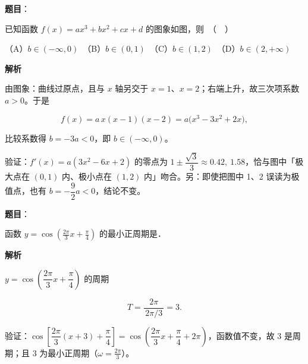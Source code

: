 \begin{answer}

\textbf{题目}：

已知函数 $f(x) = ax^3 + bx^2 + cx + d$ 的图象如图，则　（　）
\nopagebreak[4]
\begin{center}\end{center}
\nopagebreak[4]
（A）$b \in (-\infty, 0)$　（B）$b \in (0, 1)$　（C）$b \in (1, 2)$　（D）$b \in (2, +\infty)$

\textbf{解析}

由图象：曲线过原点，且与 $x$ 轴另交于 $x=1$、$x=2$；右端上升，故三次项系数 $a>0$。于是

\nopagebreak[4]
\[f(x)=a\,x(x-1)(x-2)=a\big(x^3-3x^2+2x\big),\]

比较系数得 $b=-3a<0$，即 $b\in(-\infty,0)$。

验证：$f'(x)=a(3x^2-6x+2)$ 的零点为 $1\pm\dfrac{\sqrt3}{3}\approx0.42,\ 1.58$，恰与图中「极大点在 $(0,1)$ 内、极小点在 $(1,2)$ 内」吻合。另：即使把图中 1、2 误读为极值点，也有 $b=-\dfrac92a<0$，结论不变。


\par\medskip

\end{answer}
\begin{answer}

\textbf{题目}：

函数 $y = \cos\left(\frac{2\pi}{3}x + \frac{\pi}{4}\right)$ 的最小正周期是\gkblank{}．

\textbf{解析}

$y=\cos\!\left(\dfrac{2\pi}{3}x+\dfrac\pi4\right)$ 的周期

\nopagebreak[4]
\[T=\frac{2\pi}{\,2\pi/3\,}=3 .\]

验证：$\cos\!\left[\dfrac{2\pi}{3}(x+3)+\dfrac\pi4\right]=\cos\!\left(\dfrac{2\pi}{3}x+\dfrac\pi4+2\pi\right)$，函数值不变，故 3 是周期；且 $3$ 为最小正周期（$\omega=\tfrac{2\pi}{3}$）。


\par\medskip

\end{answer}

